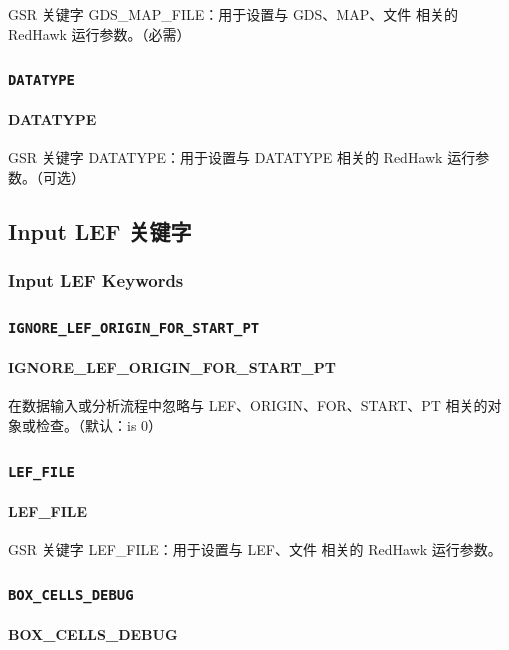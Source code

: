 GSR 关键字 GDS_MAP_FILE：用于设置与 GDS、MAP、文件 相关的 RedHawk 运行参数。（必需）

\subsubsection{\texttt{DATATYPE}}
\paragraph*{DATATYPE}

GSR 关键字 DATATYPE：用于设置与 DATATYPE 相关的 RedHawk 运行参数。（可选）

\subsection{Input LEF 关键字}
\subsubsection*{Input LEF Keywords}

\subsubsection{\texttt{IGNORE_LEF_ORIGIN_FOR_START_PT}}
\paragraph*{IGNORE_LEF_ORIGIN_FOR_START_PT}

在数据输入或分析流程中忽略与 LEF、ORIGIN、FOR、START、PT 相关的对象或检查。（默认：is 0）

\subsubsection{\texttt{LEF_FILE}}
\paragraph*{LEF_FILE}

GSR 关键字 LEF_FILE：用于设置与 LEF、文件 相关的 RedHawk 运行参数。

\subsubsection{\texttt{BOX_CELLS_DEBUG}}
\paragraph*{BOX_CELLS_DEBUG}

